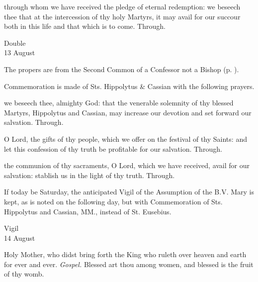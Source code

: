 \postcommunion
{} through whom we have received the pledge of eternal redemption: we beseech thee that at the intercession of thy holy Martyrs, it may avail for our succour both in this life and that which is to come. Through.

\begin{inhead}
    {Double\\
13 August}
\end{inhead}

\begin{rubric}
	The propers are from the Second Common of a Confessor not a Bishop (p. \pageref{CommonConfessorNotBishopII}).
\end{rubric}
\begin{rubric}
	Commemoration is made of Sts. Hippolytus \& Cassian with the following prayers.
\end{rubric}
\collect
{} we beseech thee, almighty God: that the venerable solemnity of thy blessed Martyrs, Hippolytus and Cassian, may increase our devotion and set forward our salvation. Through.

\secret
{} O Lord, the gifts of thy people, which we offer on the festival of thy Saints: and let this confession of thy truth be profitable for our salvation. Through.

\postcommunion
{} the communion of thy sacraments, O Lord, which we have received, avail for our salvation: stablish us in the light of thy truth. Through.

\begin{rubric}
	If today be Saturday, the anticipated Vigil of the Assumption of the B.V. Mary is kept, as is noted on the following day, but with Commemoration of Sts. Hippolytus and Cassian, MM., instead of St. Eusebius.
\end{rubric}

\begin{inhead}
    {Vigil\\
14 August}
\end{inhead}

\introit
{} Holy Mother, who didst bring forth the King who ruleth over heaven and earth for ever and ever. \textit{Gospel.} Blessed art thou among women, and blessed is the fruit of thy womb.

